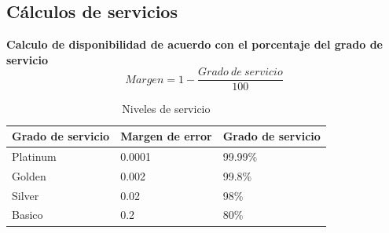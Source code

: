 \documentclass[12pt,letterpaper]{article}
\begin{document}
\newpage
\subsection{Cálculos de servicios}
\textbf{Calculo de disponibilidad de acuerdo con el porcentaje del grado de servicio}
\begin{equation}
    Margen=1-\frac{Grado \ de \ servicio}{100}
\end{equation}

\begin{table}[ht]
    \centering
    \begin{tabular}{|l|l|l|}
    \hline
    Grado de servicio & Margen de error & Grado de servicio \\ \hline
    Platinum & 0.0001 & 99.99\% \\ \hline
    Golden & 0.002 & 99.8\% \\ \hline
    Silver & 0.02 & 98\% \\ \hline
    Basico & 0.2 & 80\% \\ \hline
    \end{tabular}
    \caption{Niveles de servicio}
    \label{my-label}
\end{table}
\end{document}
